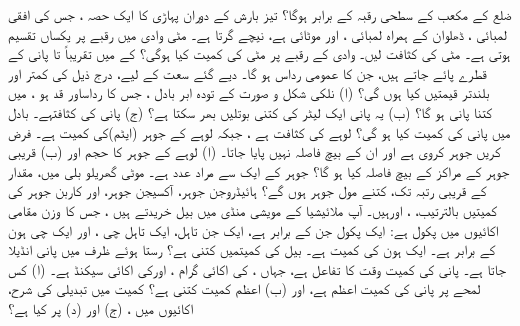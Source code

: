    ضلع   کے  مکعب کے  سطحی رقبہ کے برابر ہوگا؟ 
تیز بارش کے دوران پہاڑی کا ایک حصہ ، جس کی افقی  لمبائی ، ڈھلوان کے ہمراہ لمبائی ، اور موٹائی  ہے،  نیچے گرتا ہے۔  مٹی وادی میں  رقبے پر یکساں تقسیم ہوتی ہے۔ مٹی کی کثافت لیں۔ وادی کے رقبے پر مٹی کی کمیت کیا ہوگی؟
 کے   میں تقریباً  تا پانی کے قطرے پائے جاتے ہیں، جن کا عمومی   رداس ہو گا۔ دیے گئے  سعت  کے لیے، درج ذیل کی کمتر اور بلندتر قیمتیں کیا ہوں گی؟  (ا) نلکی شکل  و صورت کے تودہ ابر بادل ، جس کا  رداساور قد  ہو ، میں کتنا  پانی  ہو  گا؟  (ب) یہ پانی ایک لیٹر کی  کتنی بوتلیں بھر سکتا ہے؟  (ج) پانی کی کثافتہے۔   بادل میں  پانی کی کمیت کیا ہو گی؟ 
لوہے کی کثافت ہے ، جبکہ لوہے کے جوہر  (ایٹم)کی کمیت ہے۔ فرض کریں  جوہر کروی ہے اور ان کے بیچ  فاصلہ نہیں پایا جاتا۔  (ا)   لوہے کے جوہر کا حجم اور  (ب) قریبی جوہر کے مراکز کے بیچ فاصلہ کیا  ہو گا؟ 
جوہر کے  ایک   سے مراد عدد  ہے۔  موٹی گھریلو بلی میں، مقدار کے قریبی رتبہ تک،  کتنے  مول  جوہر  ہوں گے؟ ہائیڈروجن جوہر، آکسیجن جوہر، اور کاربن جوہر کی کمیتیں بالترتیب،
 ، اورہیں۔ 
آپ ملائیشیا کے مویشی منڈی میں  بیل خریدتے ہیں ، جس کا  وزن مقامی اکائیوں میں  پکول  ہے:  ایک پکول   جن کے برابر ہے،   ایک جن     تاہل، ایک تاہل     چی ، اور ایک چی  ہون  کے برابر ہے۔ ایک ہون کی کمیت ہے۔ بیل کی کمیتمیں کتنی ہے؟ 
رستا ہوئے ظرف میں پانی انڈیلا جاتا ہے۔ پانی کی کمیت وقت  کا تفاعل  ہے، جہاں ، کی اکائی گرام  ، اورکی اکائی سیکنڈ  ہے۔  (ا) کس لمحے پر  پانی کی کمیت  اعظم ہے، اور   (ب)   اعظم کمیت کتنی ہے؟  کمیت میں تبدیلی کی شرح،  اکائیوں میں ،  (ج) اور  (د)  پر  کیا ہے؟ 
